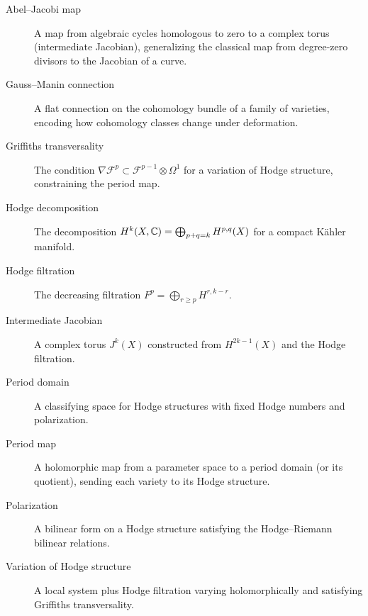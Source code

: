 \begin{description}
    \item[Abel--Jacobi map] A map from algebraic cycles homologous to zero to a complex torus (intermediate Jacobian), generalizing the classical map from degree-zero divisors to the Jacobian of a curve.
    \item[Gauss--Manin connection] A flat connection on the cohomology bundle of a family of varieties, encoding how cohomology classes change under deformation.
    \item[Griffiths transversality] The condition $\nabla \mathcal{F}^p \subset \mathcal{F}^{p-1} \otimes \Omega^1$ for a variation of Hodge structure, constraining the period map.
    \item[Hodge decomposition] The decomposition $H^k(X,\mathbb{C}) = \bigoplus_{p+q=k} H^{p,q}(X)$ for a compact K\"ahler manifold.
    \item[Hodge filtration] The decreasing filtration $F^p = \bigoplus_{r \geq p} H^{r,k-r}$.
    \item[Intermediate Jacobian] A complex torus $J^k(X)$ constructed from $H^{2k-1}(X)$ and the Hodge filtration.
    \item[Period domain] A classifying space for Hodge structures with fixed Hodge numbers and polarization.
    \item[Period map] A holomorphic map from a parameter space to a period domain (or its quotient), sending each variety to its Hodge structure.
    \item[Polarization] A bilinear form on a Hodge structure satisfying the Hodge--Riemann bilinear relations.
    \item[Variation of Hodge structure] A local system plus Hodge filtration varying holomorphically and satisfying Griffiths transversality.
\end{description}

